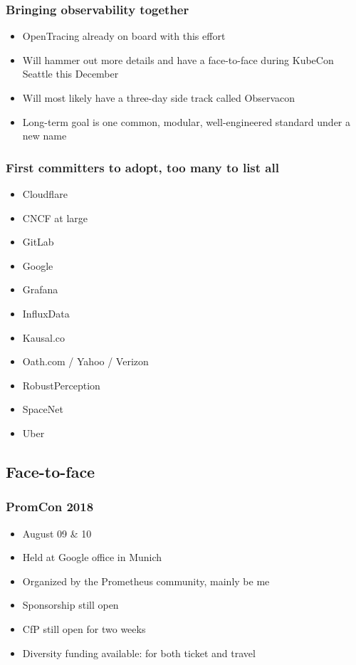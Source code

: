 \documentclass[t]{beamer}
\begin{document}
\begin{frame}
	\frametitle{Bringing observability together}
	\begin{itemize}
		\item OpenTracing already on board with this effort
		\item Will hammer out more details and have a face-to-face during KubeCon Seattle this December
		\item Will most likely have a three-day side track called Observacon
		\item Long-term goal is one common, modular, well-engineered standard under a new name
	\end{itemize}
\end{frame}



\begin{frame}
	\frametitle{First committers to adopt, too many to list all}
	\begin{itemize}
		\item Cloudflare
		\item CNCF at large
		\item GitLab
		\item Google
		\item Grafana
		\item InfluxData
		\item Kausal.co
		\item Oath.com / Yahoo / Verizon
		\item RobustPerception
		\item SpaceNet
		\item Uber
	\end{itemize}
\end{frame}


\subsection{Face-to-face}

\begin{frame}
	\frametitle{PromCon 2018}
	\begin{itemize}
		\item August 09 \& 10
		\item Held at Google office in Munich
		\item Organized by the Prometheus community, mainly be me
		\item Sponsorship still open
		\item CfP still open for two weeks
		\item Diversity funding available: for both ticket and travel
	\end{itemize}
\end{frame}
\end{document}
